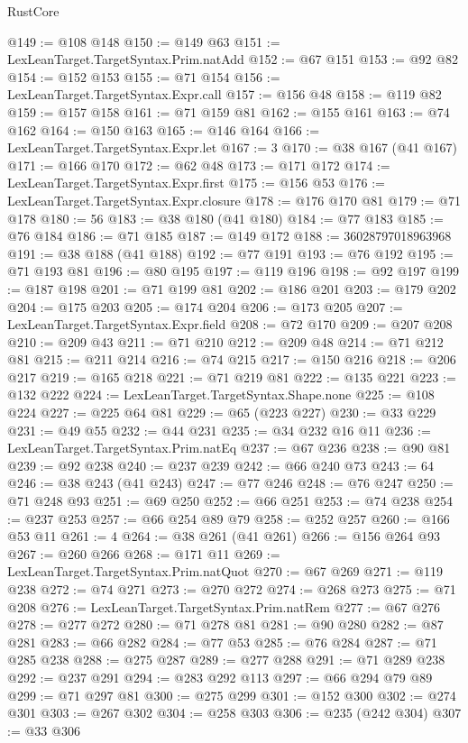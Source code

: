 \begin{lexlean}{RustCore}
\begin{coremodule}
@149 := @108 @148
@150 := @149 @63
@151 := LexLeanTarget.TargetSyntax.Prim.natAdd
@152 := @67 @151
@153 := @92 @82
@154 := @152 @153
@155 := @71 @154
@156 := LexLeanTarget.TargetSyntax.Expr.call
@157 := @156 @48
@158 := @119 @82
@159 := @157 @158
@161 := @71 @159 @81
@162 := @155 @161
@163 := @74 @162
@164 := @150 @163
@165 := @146 @164
@166 := LexLeanTarget.TargetSyntax.Expr.let
@167 := 3
@170 := @38 @167 (@41 @167)
@171 := @166 @170
@172 := @62 @48
@173 := @171 @172
@174 := LexLeanTarget.TargetSyntax.Expr.first
@175 := @156 @53
@176 := LexLeanTarget.TargetSyntax.Expr.closure
@178 := @176 @170 @81
@179 := @71 @178
@180 := 56
@183 := @38 @180 (@41 @180)
@184 := @77 @183
@185 := @76 @184
@186 := @71 @185
@187 := @149 @172
@188 := 36028797018963968
@191 := @38 @188 (@41 @188)
@192 := @77 @191
@193 := @76 @192
@195 := @71 @193 @81
@196 := @80 @195
@197 := @119 @196
@198 := @92 @197
@199 := @187 @198
@201 := @71 @199 @81
@202 := @186 @201
@203 := @179 @202
@204 := @175 @203
@205 := @174 @204
@206 := @173 @205
@207 := LexLeanTarget.TargetSyntax.Expr.field
@208 := @72 @170
@209 := @207 @208
@210 := @209 @43
@211 := @71 @210
@212 := @209 @48
@214 := @71 @212 @81
@215 := @211 @214
@216 := @74 @215
@217 := @150 @216
@218 := @206 @217
@219 := @165 @218
@221 := @71 @219 @81
@222 := @135 @221
@223 := @132 @222
@224 := LexLeanTarget.TargetSyntax.Shape.none
@225 := @108 @224
@227 := @225 @64 @81
@229 := @65 (@223 @227)
@230 := @33 @229
@231 := @49 @55
@232 := @44 @231
@235 := @34 @232 @16 @11
@236 := LexLeanTarget.TargetSyntax.Prim.natEq
@237 := @67 @236
@238 := @90 @81
@239 := @92 @238
@240 := @237 @239
@242 := @66 @240 @73
@243 := 64
@246 := @38 @243 (@41 @243)
@247 := @77 @246
@248 := @76 @247
@250 := @71 @248 @93
@251 := @69 @250
@252 := @66 @251
@253 := @74 @238
@254 := @237 @253
@257 := @66 @254 @89 @79
@258 := @252 @257
@260 := @166 @53 @11
@261 := 4
@264 := @38 @261 (@41 @261)
@266 := @156 @264 @93
@267 := @260 @266
@268 := @171 @11
@269 := LexLeanTarget.TargetSyntax.Prim.natQuot
@270 := @67 @269
@271 := @119 @238
@272 := @74 @271
@273 := @270 @272
@274 := @268 @273
@275 := @71 @208
@276 := LexLeanTarget.TargetSyntax.Prim.natRem
@277 := @67 @276
@278 := @277 @272
@280 := @71 @278 @81
@281 := @90 @280
@282 := @87 @281
@283 := @66 @282
@284 := @77 @53
@285 := @76 @284
@287 := @71 @285 @238
@288 := @275 @287
@289 := @277 @288
@291 := @71 @289 @238
@292 := @237 @291
@294 := @283 @292 @113
@297 := @66 @294 @79 @89
@299 := @71 @297 @81
@300 := @275 @299
@301 := @152 @300
@302 := @274 @301
@303 := @267 @302
@304 := @258 @303
@306 := @235 (@242 @304)
@307 := @33 @306

\end{coremodule}
\end{lexlean}

